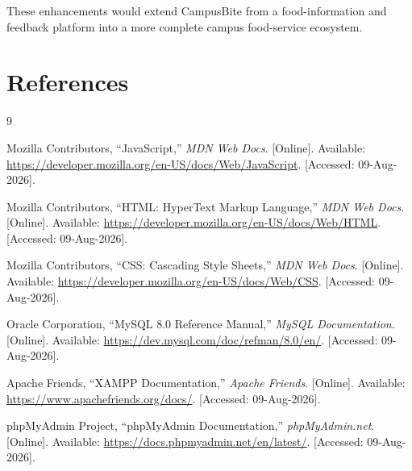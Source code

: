 \documentclass[ 12pt,a4paper,twocolumn,fleqn]{article}
\begin{document}
These enhancements would extend CampusBite from a food-information and feedback platform into a more complete campus food-service ecosystem.

\clearpage

\newpage

\section{References}
\begin{thebibliography}{9}

Mozilla Contributors, ``JavaScript,'' \textit{MDN Web Docs}. [Online]. Available: \url{https://developer.mozilla.org/en-US/docs/Web/JavaScript}. [Accessed: 09-Aug-2026].

Mozilla Contributors, ``HTML: HyperText Markup Language,'' \textit{MDN Web Docs}. [Online]. Available: \url{https://developer.mozilla.org/en-US/docs/Web/HTML}. [Accessed: 09-Aug-2026].

Mozilla Contributors, ``CSS: Cascading Style Sheets,'' \textit{MDN Web Docs}. [Online]. Available: \url{https://developer.mozilla.org/en-US/docs/Web/CSS}. [Accessed: 09-Aug-2026].

Oracle Corporation, ``MySQL 8.0 Reference Manual,'' \textit{MySQL Documentation}. [Online]. Available: \url{https://dev.mysql.com/doc/refman/8.0/en/}. [Accessed: 09-Aug-2026].

Apache Friends, ``XAMPP Documentation,'' \textit{Apache Friends}. [Online]. Available: \url{https://www.apachefriends.org/docs/}. [Accessed: 09-Aug-2026].

phpMyAdmin Project, ``phpMyAdmin Documentation,'' \textit{phpMyAdmin.net}. [Online]. Available: \url{https://docs.phpmyadmin.net/en/latest/}. [Accessed: 09-Aug-2026].

\end{thebibliography}
\end{document}
